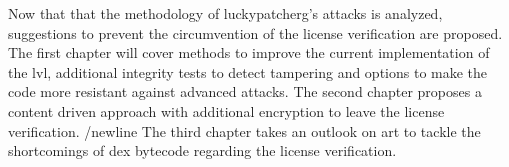Now that that the methodology of \gls{luckypatcherg}'s attacks is analyzed, suggestions to prevent the circumvention of the license verification are proposed.
\newline
The first chapter will cover methods to improve the current implementation of the \gls{lvl}, additional integrity tests to detect tampering and options to make the code more resistant against advanced attacks.
\newline
The second chapter proposes a content driven approach with additional encryption to leave the license verification.
/newline
The third chapter takes an outlook on \gls{art} to tackle the shortcomings of dex bytecode regarding the license verification.
